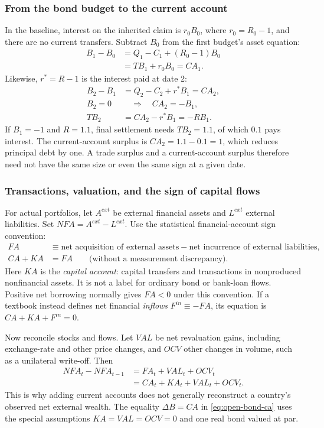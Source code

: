 \subsubsection{From the bond budget to the current account}

In the baseline, interest on the inherited claim is $r_0B_0$, where
$r_0=R_0-1$, and there are no current transfers. Subtract $B_0$ from the
first budget's asset equation:
\begin{align}
 B_1-B_0&=Q_1-C_1+(R_0-1)B_0\\
 &=TB_1+r_0B_0=CA_1.\label{eq:open-bond-ca}
\end{align}
Likewise, $r^*=R-1$ is the interest paid at date 2:
\begin{align}
 B_2-B_1&=Q_2-C_2+r^*B_1=CA_2,\\
 B_2=0&\quad\Longrightarrow\quad CA_2=-B_1,\\
 TB_2&=CA_2-r^*B_1=-RB_1.
\end{align}
If $B_1=-1$ and $R=1.1$, final settlement needs $TB_2=1.1$, of which $0.1$
pays interest. The current-account surplus is $CA_2=1.1-0.1=1$, which
reduces principal debt by one. A trade surplus and a current-account surplus
therefore need not have the same size or even the same sign at a given date.

\subsubsection{Transactions, valuation, and the sign of capital flows}

For actual portfolios, let $A^{ext}$ be external financial assets and
$L^{ext}$ external liabilities. Set $NFA=A^{ext}-L^{ext}$. Use the statistical
financial-account sign convention:
\begin{align}
 FA&\equiv\text{net acquisition of external assets}
             -\text{net incurrence of external liabilities},\\
 CA+KA&=FA\qquad\text{(without a measurement discrepancy)}.\label{eq:open-bop-sign}
\end{align}
Here $KA$ is the \emph{capital account}: capital transfers and transactions
in nonproduced nonfinancial assets. It is not a label for ordinary bond or
bank-loan flows. Positive net borrowing normally gives $FA<0$ under this
convention. If a textbook instead defines net financial \emph{inflows}
$F^{in}\equiv-FA$, its equation is $CA+KA+F^{in}=0$.

Now reconcile stocks and flows. Let $VAL$ be net revaluation gains, including
exchange-rate and other price changes, and $OCV$ other changes in volume,
such as a unilateral write-off. Then
\begin{align}
 NFA_t-NFA_{t-1}&=FA_t+VAL_t+OCV_t\\
 &=CA_t+KA_t+VAL_t+OCV_t.\label{eq:open-iip-reconcile}
\end{align}
This is why adding current accounts does not generally reconstruct a country's
observed net external wealth. The equality $\Delta B=CA$ in
\eqref{eq:open-bond-ca} uses the special assumptions $KA=VAL=OCV=0$ and
one real bond valued at par.

